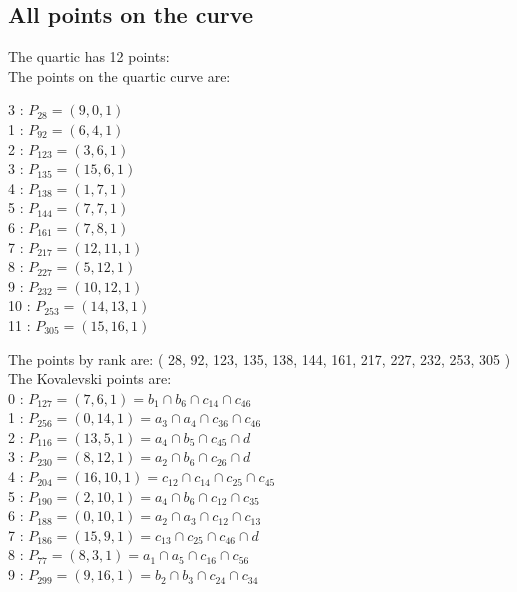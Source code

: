 \documentclass{article}
\begin{document}
{\subsection*{All points on the curve}
The quartic has 12 points:\\
The points on the quartic curve are:\\
\begin{multicols}{3}
 : $P_{28}=( 9, 0, 1 )$\\
1 : $P_{92}=( 6, 4, 1 )$\\
2 : $P_{123}=( 3, 6, 1 )$\\
3 : $P_{135}=( 15, 6, 1 )$\\
4 : $P_{138}=( 1, 7, 1 )$\\
5 : $P_{144}=( 7, 7, 1 )$\\
6 : $P_{161}=( 7, 8, 1 )$\\
7 : $P_{217}=( 12, 11, 1 )$\\
8 : $P_{227}=( 5, 12, 1 )$\\
9 : $P_{232}=( 10, 12, 1 )$\\
10 : $P_{253}=( 14, 13, 1 )$\\
11 : $P_{305}=( 15, 16, 1 )$\\
\end{multicols}
The points by rank are: 
( 28, 92, 123, 135, 138, 144, 161, 217, 227, 232, 253, 305 )\\
The Kovalevski points are: \\
0 : $P_{127}=( 7, 6, 1 ) = b_{1} \cap b_{6} \cap c_{14} \cap c_{46}$\\
1 : $P_{256}=( 0, 14, 1 ) = a_{3} \cap a_{4} \cap c_{36} \cap c_{46}$\\
2 : $P_{116}=( 13, 5, 1 ) = a_{4} \cap b_{5} \cap c_{45} \cap d$\\
3 : $P_{230}=( 8, 12, 1 ) = a_{2} \cap b_{6} \cap c_{26} \cap d$\\
4 : $P_{204}=( 16, 10, 1 ) = c_{12} \cap c_{14} \cap c_{25} \cap c_{45}$\\
5 : $P_{190}=( 2, 10, 1 ) = a_{4} \cap b_{6} \cap c_{12} \cap c_{35}$\\
6 : $P_{188}=( 0, 10, 1 ) = a_{2} \cap a_{3} \cap c_{12} \cap c_{13}$\\
7 : $P_{186}=( 15, 9, 1 ) = c_{13} \cap c_{25} \cap c_{46} \cap d$\\
8 : $P_{77}=( 8, 3, 1 ) = a_{1} \cap a_{5} \cap c_{16} \cap c_{56}$\\
9 : $P_{299}=( 9, 16, 1 ) = b_{2} \cap b_{3} \cap c_{24} \cap c_{34}$\\
}
\end{document}
